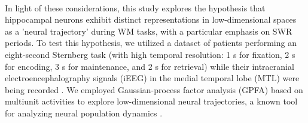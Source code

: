 \\
\indent
In light of these considerations, this study explores the hypothesis that hippocampal neurons exhibit distinct representations in low-dimensional spaces as a 'neural trajectory' during WM tasks, with a particular emphasis on SWR periods. To test this hypothesis, we utilized a dataset of patients performing an eight-second Sternberg task (with high temporal resolution: 1 s for fixation, 2 s for encoding, 3 s for maintenance, and 2 s for retrieval) while their intracranial electroencephalography signals (iEEG) in the medial temporal lobe (MTL) were being recorded \cite{boran_dataset_2020}. We employed Gaussian-process factor analysis (GPFA) based on multiunit activities to explore low-dimensional neural trajectories, a known tool for analyzing neural population dynamics \cite{yu_gaussian-process_2009}.
\label{sec:introduction}